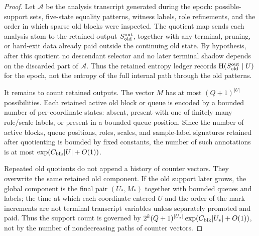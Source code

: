 \documentclass[11pt]{article}
\theoremstyle{remark}
\newcommand{\HH}{\mathrm H}
\newcommand{\old}{\mathrm{old}}
\begin{document}
\begin{proof}
Let $\mathcal A$ be the analysis transcript generated during the epoch: possible-support sets, five-state equality patterns, witness labels, role refinements, and the order in which sparse old blocks were inspected.  The quotient map sends each analysis atom to the retained output $S_{\old}^{\rm out}$, together with any terminal, pruning, or hard-exit data already paid outside the continuing old state.  By hypothesis, after this quotient no descendant selector and no later terminal shadow depends on the discarded part of $\mathcal A$.  Thus the retained entropy ledger records $\HH(S_{\old}^{\rm out}\mid U)$ for the epoch, not the entropy of the full internal path through the old patterns.

It remains to count retained outputs.  The vector $M$ has at most $(Q+1)^{|U|}$ possibilities.  Each retained active old block or queue is encoded by a bounded number of per-coordinate states: absent, present with one of finitely many role/scale labels, or present in a bounded queue position.  Since the number of active blocks, queue positions, roles, scales, and sample-label signatures retained after quotienting is bounded by fixed constants, the number of such annotations is at most $\exp(C_{\rm blk}|U|+O(1))$.

Repeated old quotients do not append a history of counter vectors.  They overwrite the same retained old component.  If the old support later grows, the global component is the final pair $(U_*,M_*)$ together with bounded queues and labels; the time at which each coordinate entered $U$ and the order of the mark increments are not terminal transcript variables unless separately promoted and paid.  Thus the support count is governed by $2^k(Q+1)^{|U_*|}\exp(C_{\rm blk}|U_*|+O(1))$, not by the number of nondecreasing paths of counter vectors.
\end{proof}
\end{document}
